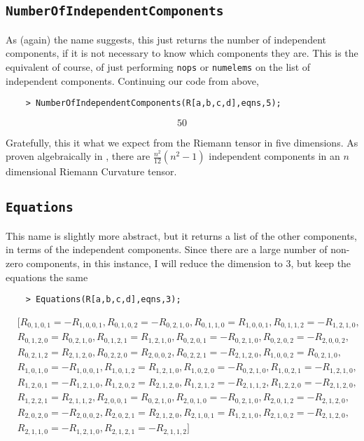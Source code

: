\documentclass{article}
\begin{document}
\subsection*{\verb~NumberOfIndependentComponents~}

As (again) the name suggests, this just returns the number of independent components, if it is not necessary to know which components they are. This is the equivalent of course, of just performing \verb~nops~ or \verb~numelems~ on the list of independent components. Continuing our code from above,

\begin{verbatim}
    > NumberOfIndependentComponents(R[a,b,c,d],eqns,5);
\end{verbatim}
\begin{equation*}
    50
\end{equation*}

Gratefully, this it what we expect from the Riemann tensor in five dimensions. As proven algebraically in \cite{relativity}, there are $\frac{n^2}{12}(n^2-1)$ independent components in an $n$ dimensional Riemann Curvature tensor.

\subsection*{\verb~Equations~}

This name is slightly more abstract, but it returns a list of the other components, in terms of the independent components. Since there are a large number of non-zero components, in this instance, I will reduce the dimension to $3$, but keep the equations the same

\begin{verbatim}
    > Equations(R[a,b,c,d],eqns,3);
\end{verbatim}
\begin{equation*}
    \begin{split}
    & [R_{{0,1,0,1}}=-R_{{1,0,0,1}},R_{{0,1,0,2}}=-R_{{0,2,1,0}},R_{{0,1,1,0
}}=R_{{1,0,0,1}},R_{{0,1,1,2}}=-R_{{1,2,1,0}}, \\ & R_{{0,1,2,0}}=R_{{0,2,1,0
}},R_{{0,1,2,1}}=R_{{1,2,1,0}},R_{{0,2,0,1}}=-R_{{0,2,1,0}},R_{{0,2,0,
2}}=-R_{{2,0,0,2}}, \\ & R_{{0,2,1,2}}=R_{{2,1,2,0}},R_{{0,2,2,0}}=R_{{2,0,0
,2}},R_{{0,2,2,1}}=-R_{{2,1,2,0}},R_{{1,0,0,2}}=R_{{0,2,1,0}}, \\ & R_{{1,0,
1,0}}=-R_{{1,0,0,1}},R_{{1,0,1,2}}=R_{{1,2,1,0}},R_{{1,0,2,0}}=-R_{{0,
2,1,0}}, R_{{1,0,2,1}}=-R_{{1,2,1,0}}, \\ & R_{{1,2,0,1}}=-R_{{1,2,1,0}},R_{{
1,2,0,2}}=R_{{2,1,2,0}},R_{{1,2,1,2}}=-R_{{2,1,1,2}}, R_{{1,2,2,0}}=-R_
{{2,1,2,0}}, \\ & R_{{1,2,2,1}}=R_{{2,1,1,2}},R_{{2,0,0,1}}=R_{{0,2,1,0}},R_
{{2,0,1,0}}=-R_{{0,2,1,0}},R_{{2,0,1,2}}=-R_{{2,1,2,0}}, \\ & R_{{2,0,2,0}}=
-R_{{2,0,0,2}},R_{{2,0,2,1}}=R_{{2,1,2,0}},R_{{2,1,0,1}}=R_{{1,2,1,0}}
,R_{{2,1,0,2}}=-R_{{2,1,2,0}}, \\ & R_{{2,1,1,0}}=-R_{{1,2,1,0}},R_{{2,1,2,1
}}=-R_{{2,1,1,2}}]
    \end{split}
\end{equation*}
\end{document}
